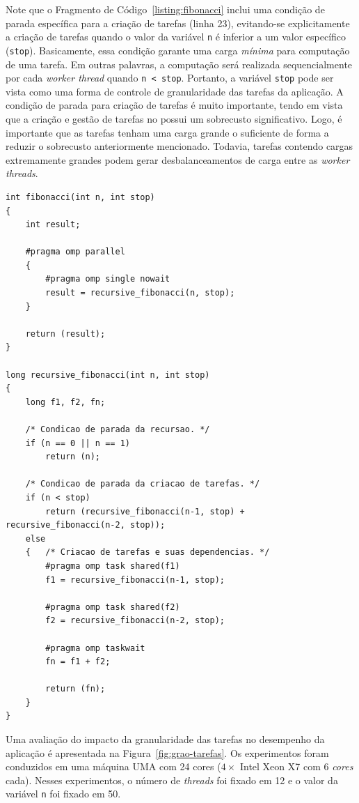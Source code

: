 \documentclass{SBCbookchapter}
\begin{document}
	Note que o Fragmento de Código~\ref{listing:fibonacci} inclui uma
	condição de parada específica para a criação de tarefas (linha 23),
	evitando-se explicitamente a criação de tarefas quando o valor da
	variável \texttt{n} é inferior a um valor específico
	(\texttt{stop}).  Basicamente, essa condição garante uma carga
	\textit{mínima} para computação de uma tarefa. Em outras palavras, a
	computação será realizada sequencialmente por cada \textit{worker
	thread} quando \texttt{n < stop}. Portanto, a variável \texttt{stop}
	pode ser vista como uma forma de controle de granularidade das
	tarefas da aplicação.  A condição de parada para criação de tarefas
	é muito importante, tendo em vista que a criação e gestão de tarefas
	no \openmp possui um sobrecusto significativo. Logo, é importante
	que as tarefas tenham uma carga grande o suficiente de forma a
	reduzir o sobrecusto anteriormente mencionado. Todavia, tarefas
	contendo cargas extremamente grandes podem gerar desbalanceamentos
	de carga entre as \textit{worker threads}.

\begin{lstlisting}[frame=single, caption=Exemplo de uma implementação recursiva simples da soma da sequencia de Fibonacci
usando tarefas., label=listing:fibonacci]
int fibonacci(int n, int stop)
{
	int result;
	
	#pragma omp parallel
  	{
		#pragma omp single nowait
		result = recursive_fibonacci(n, stop);
	}
		
	return (result);
}

long recursive_fibonacci(int n, int stop)
{
	long f1, f2, fn;

	/* Condicao de parada da recursao. */
	if (n == 0 || n == 1) 
		return (n);

	/* Condicao de parada da criacao de tarefas. */
	if (n < stop) 
		return (recursive_fibonacci(n-1, stop) + recursive_fibonacci(n-2, stop));
	else
	{	/* Criacao de tarefas e suas dependencias. */
		#pragma omp task shared(f1)
		f1 = recursive_fibonacci(n-1, stop);

		#pragma omp task shared(f2)
		f2 = recursive_fibonacci(n-2, stop);
		
		#pragma omp taskwait
		fn = f1 + f2;
			
		return (fn);
	}
}
\end{lstlisting}

	Uma avaliação do impacto da granularidade das tarefas no desempenho
	da aplicação é apresentada na Figura~\ref{fig:grao-tarefas}. Os
	experimentos foram conduzidos em uma máquina UMA com 24 cores ($4
	\times$ Intel Xeon X7 com 6 \textit{cores} cada). Nesses
	experimentos, o número de \textit{threads} foi fixado em 12 e o
	valor da variável \texttt{n} foi fixado em 50.
	
\end{document}
